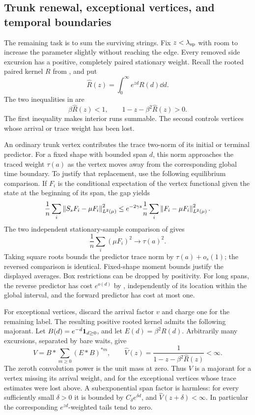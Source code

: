 \subsection{Trunk renewal, exceptional vertices, and temporal boundaries}
\label{subsec:hidden-renewal}

The remaining task is to sum the surviving strings. Fix
$z<\lambda_{\rm sp}$ with room to increase the parameter slightly
without reaching the edge. Every removed side excursion has a
positive, completely paired stationary weight. Recall the rooted
paired kernel $R$ from , and put
\[
 \widehat R(z)=\int_0^\infty e^{zd}R(d)\dd d.
\]
The two inequalities in  are
\begin{equation}\label{eq:hidden-renewal-conditions}
 \beta\widehat R(z)<1,
 \qquad 1-z-\beta^2\widehat R(z)>0.
\end{equation}
The first inequality makes interior runs summable. The second
controls vertices whose arrival or trace weight has been lost.

An ordinary trunk vertex contributes the trace two-norm of its
initial or terminal predictor. For a fixed shape with bounded span
$d$, this norm approaches the traced weight $\tau(a)$ as the vertex
moves away from the corresponding global time boundary. To justify
that replacement, use the following equilibrium comparison. If $F_i$ is
the conditional expectation of the vertex functional given the state
at the beginning of its span, the gap yields
\[
 \frac1n\sum_i\left\lVert S_sF_i-\mu F_i\right\rVert_{L^2(\mu)}^2
 \leq e^{-2\gamma s}\frac1n\sum_i\left\lVert F_i-\mu F_i\right\rVert_{L^2(\mu)}^2.
\]
The two independent stationary-sample comparison of
 gives
\[
 \frac1n\sum_i(\mu F_i)^2\longrightarrow\tau(a)^2.
\]
Taking square roots bounds the predictor trace norm by
$\tau(a)+o_s(1)$; the reversed comparison is identical. Fixed-shape
moment bounds justify the displayed averages. Box restrictions can
be dropped by positivity. For long spans, the reverse predictor has
cost $e^{o(d)}$ by , independently of
its location within the global interval, and the forward predictor
has cost at most one.

For exceptional vertices, discard the arrival factor $v$ and charge
one for the remaining label. The resulting positive rooted kernel
admits the following majorant. Let $B(d)=e^{-d}\mathbf 1_{d\geq0}$, and let
$E(d)=\beta^2R(d)$. Arbitrarily many excursions, separated by bare
waits, give
\begin{equation}\label{eq:hidden-exceptional-kernel}
 V=B*\sum_{m\geq0}(E*B)^{*m},
 \qquad
 \widehat V(z)
 =\frac{1}{1-z-\beta^2\widehat R(z)}<\infty.
\end{equation}
The zeroth convolution power is the unit mass at zero. Thus $V$ is a
majorant for a vertex missing its arrival weight, and for the
exceptional vertices whose trace estimates were lost above. A
subexponential span factor is harmless: for every sufficiently small
$\delta>0$ it is bounded by $C_\delta e^{\delta d}$, and
$\widehat V(z+\delta)<\infty$. In particular the corresponding
$e^{zd}$-weighted tails tend to zero.

